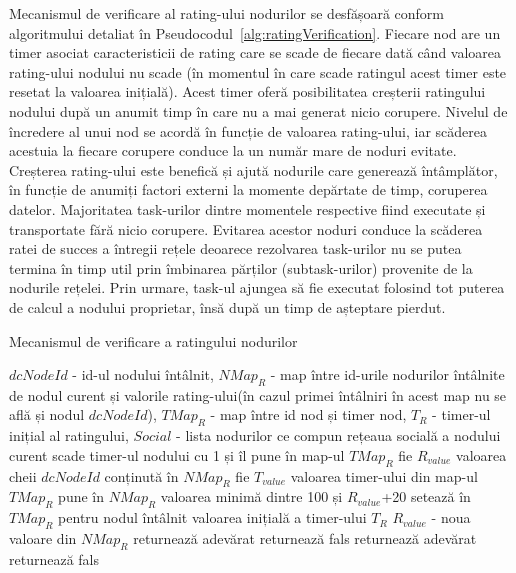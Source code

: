 \documentclass[12pt,a4paper]{report}
\begin{document}
Mecanismul de verificare al rating-ului nodurilor se desfășoară conform algoritmului detaliat în Pseudocodul~\ref{alg:ratingVerification}. Fiecare nod are un timer asociat caracteristicii de rating care se scade de fiecare dată când valoarea rating-ului nodului nu scade (în momentul în care scade ratingul acest timer este resetat la valoarea inițială). Acest timer oferă posibilitatea creșterii ratingului nodului după un anumit timp în care nu a mai generat nicio corupere. Nivelul de încredere al unui nod se acordă în funcție de valoarea rating-ului, iar scăderea acestuia la fiecare corupere conduce la un număr mare de noduri evitate. Creșterea rating-ului este benefică și ajută nodurile care generează întâmplător, în funcție de anumiți factori externi la momente depărtate de timp, coruperea datelor. Majoritatea task-urilor dintre momentele respective fiind executate și transportate fără nicio corupere. Evitarea acestor noduri conduce la scăderea ratei de succes a întregii rețele deoarece rezolvarea task-urilor nu se putea termina în timp util prin îmbinarea părților (subtask-urilor) provenite de la nodurile rețelei. Prin urmare, task-ul ajungea să fie executat folosind tot puterea de calcul a nodului proprietar, însă după un timp de așteptare pierdut. 
\begin{algorithm}
\caption{Mecanismul de verificare a ratingului nodurilor}
\label{alg:ratingVerification}
\begin{algorithmic}[1]
\scriptsize
\State $dcNodeId$ - id-ul nodului întâlnit, $NMap_R$ - map între id-urile nodurilor întâlnite de nodul curent și valorile rating-ului(în cazul primei întâlniri în acest map nu se află și nodul $dcNodeId$), $TMap_R$ - map între id nod și timer nod, $T_R$ - timer-ul inițial al ratingului, $Social$ - lista nodurilor ce compun rețeaua socială a nodului curent
		\State scade timer-ul nodului cu 1 și îl pune în map-ul $TMap_R$
		\State fie $R_{value}$ valoarea cheii $dcNodeId$ conținută în $NMap_R$
		\State fie $T_{value}$ valoarea timer-ului din map-ul $TMap_R$ 
				\State pune în $NMap_R$ valoarea minimă dintre 100 și $R_{value}$+20
				\State setează în $TMap_R$ pentru nodul întâlnit valoarea inițială a timer-ului $T_R$ 
		\EndIf
		\State $R_{value}$ - noua valoare din $NMap_R$
			\State returnează adevărat
		\Else {} returnează fals
		\EndIf
	\EndIf
		\State returnează adevărat
	\Else {} returnează fals
	\EndIf
\end{algorithmic}
\end{algorithm}
\end{document}
